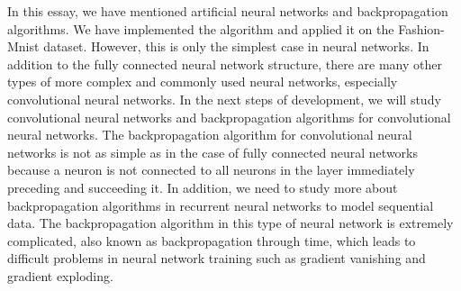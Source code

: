\documentclass[14pt, a4paper]{article}
\numberwithin{equation}{section}
\numberwithin{algorithm}{section}
\numberwithin{figure}{section}
\begin{document}
In this essay, we have mentioned artificial neural networks and backpropagation algorithms. 
We have implemented the algorithm and applied it on the Fashion-Mnist dataset. 
However, this is only the simplest case in neural networks. In addition to the fully connected neural network structure, there are many other types of more complex and commonly used neural networks, especially convolutional neural networks. 
In the next steps of development, we will study convolutional neural networks and backpropagation algorithms for convolutional neural networks. 
The backpropagation algorithm for convolutional neural networks is not as simple as in the case of fully connected neural networks because a neuron is not connected to all neurons in the layer immediately preceding and succeeding it.
In addition, we need to study more about backpropagation algorithms in recurrent neural networks to model sequential data. 
The backpropagation algorithm in this type of neural network is extremely complicated, also known as backpropagation through time, which leads to difficult problems in neural network training such as gradient vanishing and gradient exploding.

\newpage
{}
\printbibliography[title={References}]
\end{document}
